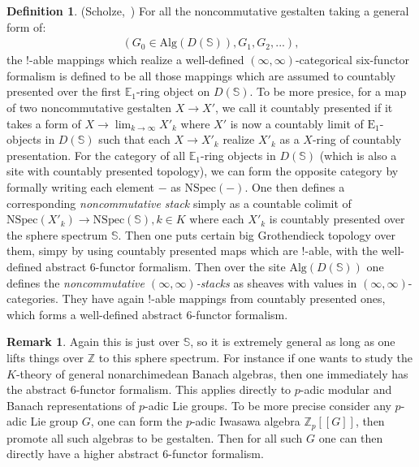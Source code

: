 \documentclass[12pt]{article}
\theoremstyle{definition}
\newtheorem{remark}{Remark}
\newtheorem{definition}{Definition}
\begin{document}
\begin{definition}\mbox{(Scholze, \cite{5S5})}
For all the noncommutative gestalten taking a general form of:
\begin{align}
(G_0\in \mathrm{Alg}(D(\mathbb{S})),G_1,G_2,...),
\end{align}
the $!$-able mappings which realize a well-defined $(\infty,\infty)$-categorical six-functor formalism is defined to be all those mappings which are assumed to countably presented over the first $\mathbb{E}_1$-ring object on $D(\mathbb{S})$. To be more presice, for a map of two noncommutative gestalten $X \rightarrow X'$, we call it countably presented if it takes a form of $X \rightarrow {\lim}_{k\rightarrow \infty} X'_{k}$ where $X'$ is now a countably limit of $\mathrm{E}_1$-objects in $D(\mathbb{S})$ such that each $X\rightarrow X'_{k}$ realize $X'_{k}$ as a $X$-ring of countably presentation. For the category of all $\mathbb{E}_1$-ring objects in $D(\mathbb{S})$ (which is also a site with countably presented topology), we can form the opposite category by formally writing each element $-$ as $\mathrm{NSpec}(-)$. One then defines a corresponding \textit{noncommutative stack} simply as a countable colimit of $\mathrm{NSpec}(X'_k)\rightarrow \mathrm{NSpec}(\mathbb{S}),k\in K$ where each $X'_k$ is countably presented over the sphere spectrum $\mathbb{S}$. Then one puts certain big Grothendieck topology over them, simpy by using countably presented maps which are $!$-able, with the well-defined abstract 6-functor formalism. Then over the site $\mathrm{Alg}(D(\mathbb{S}))$ one defines the \textit{noncommutative $(\infty,\infty)$-stacks} as sheaves with values in $(\infty,\infty)$-categories. They have again $!$-able mappings from countably presented ones, which forms a well-defined abstract 6-functor formalism.
\end{definition}

\begin{remark}\label{remark14}
Again this is just over $\mathbb{S}$, so it is extremely general as long as one lifts things over $\mathbb{Z}$ to this sphere spectrum. For instance if one wants to study the $K$-theory of general nonarchimedean Banach algebras, then one immediately has the abstract 6-functor formalism. This applies directly to $p$-adic modular and Banach representations of $p$-adic Lie groups. To be more precise consider any $p$-adic Lie group $G$, one can form the $p$-adic Iwasawa algebra $\mathbb{Z}_p[[G]]$, then promote all such algebras to be gestalten. Then for all such $G$ one can then directly have a higher abstract 6-functor formalism.
\end{remark}
\end{document}
